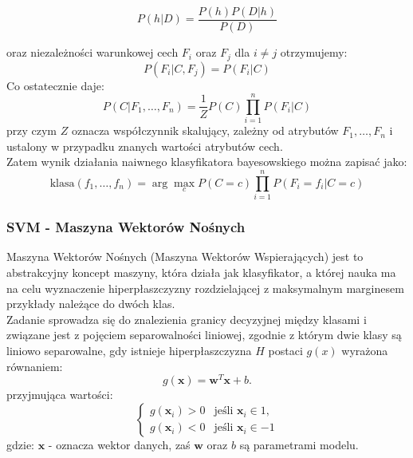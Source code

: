 \begin{equation}
    P(h|D) = \frac{P(h) P(D|h)}{P(D)}
\end{equation}

oraz niezależności warunkowej cech $F_i$ oraz $F_j$ dla $i \neq j$ otrzymujemy:
\begin{equation}
    P(F_i|C, F_j) = P(F_i|C)
\end{equation}
Co ostatecznie daje:\\

\begin{equation}
    P(C|F_1, \ldots, F_n) = \frac{1}{Z} P(C) \prod_{i=1}^n P(F_i|C)
\end{equation}
przy czym $Z$ oznacza współczynnik skalujący, zależny od atrybutów $F_1, \ldots, F_n$ i ustalony w przypadku znanych wartości atrybutów cech.\\
    
Zatem wynik działania naiwnego klasyfikatora bayesowskiego można zapisać jako:
\begin{equation}
    \text{klasa}(f_1, \ldots, f_n) = \arg\max_c P(C = c) \prod_{i=1}^n P(F_i = f_i | C = c)
\end{equation}

\subsubsection{SVM - Maszyna Wektorów Nośnych}
Maszyna Wektorów Nośnych (Maszyna Wektorów Wspierających) \cite{wyklad} jest to abstrakcyjny koncept maszyny, która działa jak klasyfikator, a której nauka ma na celu wyznaczenie hiperpłaszczyzny rozdzielającej z maksymalnym marginesem przykłady należące do dwóch klas. \cite{svm_wiki}\\

Zadanie sprowadza się do znalezienia granicy decyzyjnej między klasami i związane jest z pojęciem separowalności liniowej, zgodnie z którym dwie klasy są liniowo separowalne, gdy istnieje hiperpłaszczyzna $H$ postaci $g(x)$ wyrażona równaniem:
\begin{equation}
    g(\mathbf{x}) = \mathbf{w}^T \mathbf{x} + b.
\end{equation}
    przyjmująca wartości:
\begin{equation}
    \begin{cases}
    g(\mathbf{x}_i) > 0 & \text{jeśli } \mathbf{x}_i \in 1, \\
    g(\mathbf{x}_i) < 0 & \text{jeśli } \mathbf{x}_i \in -1
    \end{cases}
\end{equation}
    gdzie: $\mathbf{x}$ - oznacza wektor danych, zaś $\mathbf{w}$ oraz $b$ są parametrami modelu.\\

